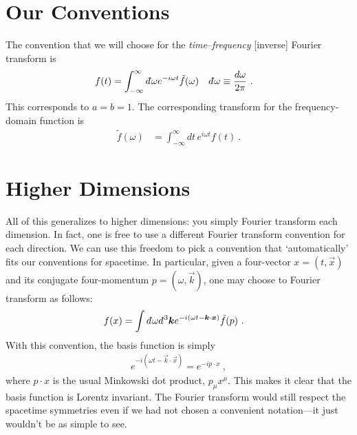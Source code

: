 \documentclass[
  11pt,
	colorful,
	raggedright,
]{tufte-style-thesis-flip}
\renewcommand{\dbar}{d\mkern-6mu\mathchar'26\hspace{-.1em}}    %
\begin{document}
\section{Our Conventions}

The convention that we will choose for the \emph{time}--\emph{frequency} [inverse] Fourier transform is
\begin{align}
  f(t) &= \int_{-\infty}^{\infty} \dbar\omega e^{-i\omega t} \tilde f(\omega)
  &
  \dbar \omega &\equiv\frac{d\omega}{2\pi} \ .
\end{align}
This corresponds to $a=b=1$. The corresponding transform for the frequency-domain function is
\begin{align}
  \tilde f(\omega) &= 
  \int_{-\infty}^\infty d t\, e^{i\omega t} f(t) \ .
  \label{eq:inverse:fourier:convention}
\end{align}


\section{Higher Dimensions}

All of this generalizes to higher dimensions: you simply Fourier transform each dimension. In fact, one is free to use a different Fourier transform convention for each direction. We can use this freedom to pick a convention that `automatically' fits our conventions for spacetime. In particular, given a four-vector $x=(t,\vec{x})$ and its conjugate four-momentum $p=(\omega, \vec{k})$, one may choose to Fourier transform as follows: 
\begin{align}
  f(x) &= \int \dbar\omega\dbar^3\vec{k} e^{-i(\omega t-\vec{k}\cdot\vec{x})} \tilde f(p)
  \ .
\end{align}
With this convention, the basis function is simply
\begin{align}
  e^{-i(\omega t-\vec{k}\cdot\vec{x})} 
  = e^{-ip\cdot x} \ , 
\end{align}
where $p\cdot x$ is the usual Minkowski dot product, $p_\mu x^\mu$. This makes it clear that the basis function is Lorentz invariant. The Fourier transform would still respect the spacetime symmetries even if we had not chosen a convenient notation---it just wouldn't be as simple to see.
\end{document}
